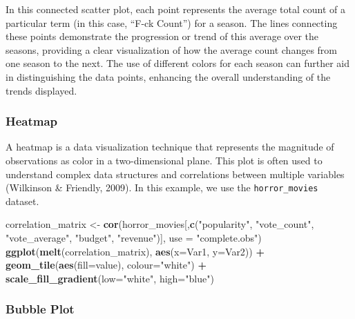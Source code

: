 \documentclass[
]{book}
\newenvironment{Shaded}{\begin{snugshade}}{\end{snugshade}}
\newcommand{\AttributeTok}[1]{\textcolor[rgb]{0.13,0.29,0.53}{#1}}
\newcommand{\FunctionTok}[1]{\textcolor[rgb]{0.13,0.29,0.53}{\textbf{#1}}}
\newcommand{\NormalTok}[1]{#1}
\newcommand{\OtherTok}[1]{\textcolor[rgb]{0.56,0.35,0.01}{#1}}
\newcommand{\SpecialCharTok}[1]{\textcolor[rgb]{0.81,0.36,0.00}{\textbf{#1}}}
\newcommand{\StringTok}[1]{\textcolor[rgb]{0.31,0.60,0.02}{#1}}
\begin{document}
In this connected scatter plot, each point represents the average total count of a particular term (in this case, ``F-ck Count'') for a season. The lines connecting these points demonstrate the progression or trend of this average over the seasons, providing a clear visualization of how the average count changes from one season to the next. The use of different colors for each season can further aid in distinguishing the data points, enhancing the overall understanding of the trends displayed.

\subsubsection*{Heatmap}\label{heatmap}

A heatmap is a data visualization technique that represents the magnitude of observations as color in a two-dimensional plane. This plot is often used to understand complex data structures and correlations between multiple variables (Wilkinson \& Friendly, 2009). In this example, we use the \texttt{horror\_movies} dataset.

\begin{Shaded}
\begin{Highlighting}[]
\NormalTok{correlation\_matrix }\OtherTok{\textless{}{-}} \FunctionTok{cor}\NormalTok{(horror\_movies[,}\FunctionTok{c}\NormalTok{(}\StringTok{"popularity"}\NormalTok{, }\StringTok{"vote\_count"}\NormalTok{, }\StringTok{"vote\_average"}\NormalTok{, }\StringTok{"budget"}\NormalTok{, }\StringTok{"revenue"}\NormalTok{)], }\AttributeTok{use =} \StringTok{"complete.obs"}\NormalTok{)}
\FunctionTok{ggplot}\NormalTok{(}\FunctionTok{melt}\NormalTok{(correlation\_matrix), }\FunctionTok{aes}\NormalTok{(}\AttributeTok{x=}\NormalTok{Var1, }\AttributeTok{y=}\NormalTok{Var2)) }\SpecialCharTok{+}
  \FunctionTok{geom\_tile}\NormalTok{(}\FunctionTok{aes}\NormalTok{(}\AttributeTok{fill=}\NormalTok{value), }\AttributeTok{colour=}\StringTok{"white"}\NormalTok{) }\SpecialCharTok{+}
  \FunctionTok{scale\_fill\_gradient}\NormalTok{(}\AttributeTok{low=}\StringTok{"white"}\NormalTok{, }\AttributeTok{high=}\StringTok{"blue"}\NormalTok{)}
\end{Highlighting}
\end{Shaded}

\subsubsection*{Bubble Plot}\label{bubble-plot}
\end{document}
